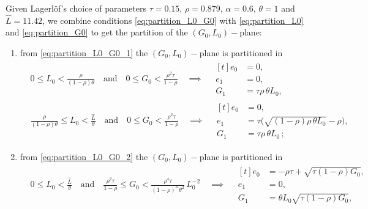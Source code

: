 \documentclass[a4paper,fleqn]{cas-sc}
\begin{document}
%
Given Lagerl\"{o}f's choice of parameters $\tau=0.15$, $\rho=0.879$, $\alpha=0.6$, $\theta=1$ and $\hat{L}=11.42$, we combine conditions \eqref{eq:partition_L0_G0} with \eqref{eq:partition_L0} and \eqref{eq:partition_G0} to get the partition of the $(G_0,L_0)-$plane:
%
\begin{enumerate}
    \item from \eqref{eq:partition_L0_G0_1} the $(G_0,L_0)-$plane is partitioned in
    \begin{subequations}\label{eq:sub_partition_1}
    \begin{align}
        &0 \leq L_0 < \frac{\rho}{(1-\rho)\theta}\quad\text{and}\quad0\leq G_0 < \frac{\rho^2\tau}{1-\rho}\quad\implies\quad 
        \begin{aligned}[t]
            e_0 &= 0, \\
            e_1 &= 0,\\
            G_1 &= \tau\rho\,\theta L_0,
        \end{aligned}
        \label{eq:sub_partition_1_1}\\
        &\frac{\rho}{(1-\rho)\theta} \leq L_0 < \frac{\hat{L}}{\theta}\quad\text{and}\quad0\leq G_0 < \frac{\rho^2\tau}{1-\rho}\quad\implies\quad
        \begin{aligned}[t]
            e_0 &= 0, \\
            e_1 &= \tau\Big(\sqrt{(1-\rho)\rho\,\theta L_0}-\rho\Big),\\
            G_1 &= \tau\rho\,\theta L_0\,;
        \end{aligned}
        \label{eq:sub_partition_1_2}
    \end{align}
    \end{subequations}
    \item from \eqref{eq:partition_L0_G0_2} the $(G_0,L_0)-$plane is partitioned in
    \begin{subequations}\label{eq:sub_partition_2}
    \begin{align}
        &0 \leq L_0 < \frac{\hat{L}}{\theta}\quad\text{and}\quad\frac{\rho^2\tau}{1-\rho}\leq G_0 < \frac{\rho^4\tau}{(1-\rho)^3\,\theta^2}\,L_0^{-2}\quad\implies\quad 
        \begin{aligned}[t]
            e_0 &= -\rho\tau + \sqrt{\tau(1-\rho)G_0}, \\
            e_1 &= 0,\\
            G_1 &= \theta L_0\sqrt{\tau(1-\rho)G_0},
        \end{aligned}
        \label{eq:sub_partition_2_1}\\

\end{align}
\end{subequations}
\end{enumerate}
\end{document}
